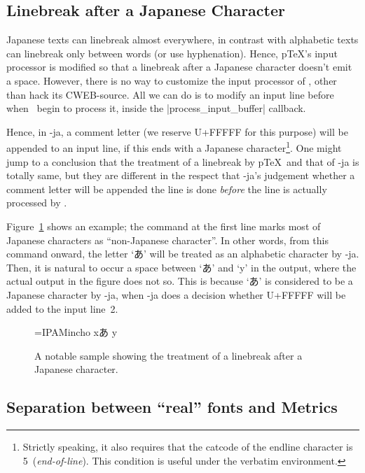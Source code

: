 \documentclass{ajt}
\begin{document}
\subsection{Linebreak after a Japanese Character}
\label{ssec-line} 

Japanese texts can linebreak almost everywhere, in contrast with
alphabetic texts can linebreak only between words (or use
hyphenation). Hence, p\TeX's input processor is modified so that a
linebreak after a Japanese character doesn't emit a space. However,
there is no way to customize the input processor of \LuaTeX, other than
hack its CWEB-source. All we can do is to modify an input line before
when \LuaTeX\ begin to process it, inside the |process_input_buffer|
callback.

Hence, in \LuaTeX-ja, a comment letter (we reserve U+FFFFF for this
purpose) will be appended to an input line, if this ends with a Japanese
character\footnote{Strictly speaking, it also requires that the catcode
of the endline character is 5~(\emph{end-of-line}). This condition is useful under the
verbatim environment.}. One might jump to a conclusion that the
treatment of a linebreak by p\TeX\ and that of \LuaTeX-ja is totally same,
but they are different in the respect that \LuaTeX-ja's judgement
whether a comment letter will be appended the line is done \emph{before}
the line is actually processed by \LuaTeX.

Figure~\ref{fig-linebreak} shows an example; the command at the first
line marks most of Japanese characters as ``non-Japanese character''. In
other words, from this command onward, the letter `あ' will be treated
as an alphabetic character by \LuaTeX-ja. Then, it is natural to occur a
space between `あ' and `y' in the output, where the actual output in the figure does
not so.  This is because `あ' is considered to be a Japanese character
by \LuaTeX-ja, when \LuaTeX-ja does a decision whether U+FFFFF will be added to the input line~2.
\begin{figure}
\begin{LTXexample}
\font\x=IPAMincho \x
{}xあ
y
\end{LTXexample}
\caption{A notable sample showing the treatment of a linebreak after a Japanese character.}\label{fig-linebreak}
\end{figure}

\subsection{Separation between ``real'' fonts and Metrics}
\label{ssec-sepmet}
\end{document}
